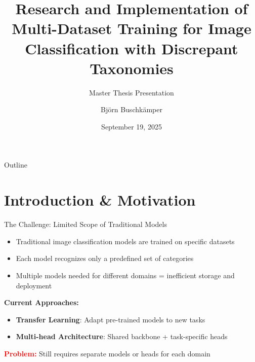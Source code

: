 \documentclass[aspectratio=169]{beamer}
\title[Multi-Dataset Training for Image Classification]{Research and Implementation of Multi-Dataset Training for Image Classification with Discrepant Taxonomies}
\subtitle{Master Thesis Presentation}
\author{Björn Buschkämper}
\institute[Bielefeld University]{Technical Faculty, Bielefeld University}
\date{September 19, 2025}
\begin{document}
\begin{frame}
    \titlepage
\end{frame}

\begin{frame}{Outline}
    \tableofcontents
\end{frame}

\section{Introduction \& Motivation}

\begin{frame}{The Challenge: Limited Scope of Traditional Models}
    \begin{itemize}
        \item Traditional image classification models are trained on specific datasets
        \item Each model recognizes only a predefined set of categories
        \item Multiple models needed for different domains = inefficient storage and deployment
    \end{itemize}

    \vspace{1em}

    \textbf{Current Approaches:}
    \begin{itemize}
        \item \textbf{Transfer Learning}: Adapt pre-trained models to new tasks
        \item \textbf{Multi-head Architecture}: Shared backbone + task-specific heads
    \end{itemize}

    \vspace{1em}

    \textcolor{red}{\textbf{Problem:}} Still requires separate models or heads for each domain
\end{frame}
\end{document}
